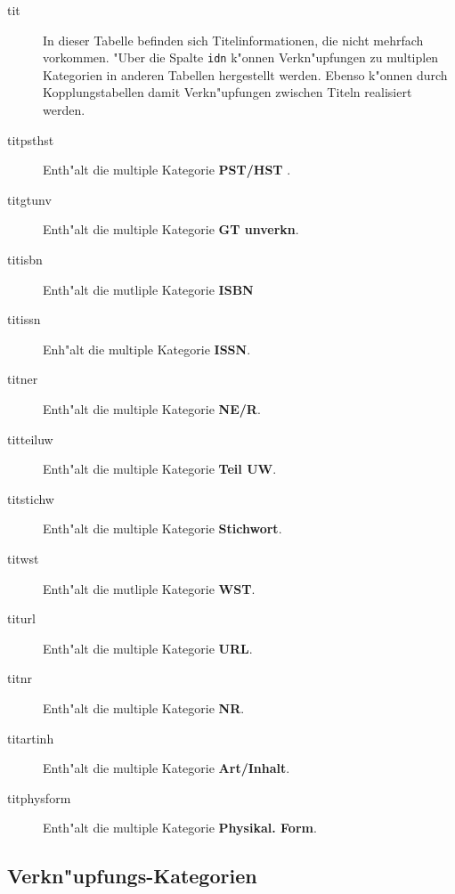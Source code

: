 \documentclass[11pt, twoside, a4paper, BCOR8mm, DIV12, bibtotoc,idxtotoc]{scrbook}
\begin{document}
\begin{description}
\item[tit] In dieser Tabelle befinden sich Titelinformationen, die
  nicht mehrfach vorkommen. "Uber die Spalte \texttt{idn} k"onnen
  Verkn"upfungen zu multiplen Kategorien in anderen Tabellen
  hergestellt werden. Ebenso k"onnen durch Kopplungstabellen damit
  Verkn"upfungen zwischen Titeln realisiert werden.
\item[titpsthst] Enth"alt die multiple Kategorie \textbf{PST/HST} .
\item[titgtunv] Enth"alt die multiple Kategorie \textbf{GT unverkn}.
\item[titisbn] Enth"alt die mutliple Kategorie \textbf{ISBN}
\item[titissn] Enh"alt die multiple Kategorie \textbf{ISSN}.
\item[titner] Enth"alt die multiple Kategorie \textbf{NE/R}.
\item[titteiluw] Enth"alt die multiple Kategorie \textbf{Teil UW}.
\item[titstichw] Enth"alt die multiple Kategorie \textbf{Stichwort}.
\item[titwst] Enth"alt die mutliple Kategorie \textbf{WST}.
\item[titurl] Enth"alt die multiple Kategorie \textbf{URL}.
\item[titnr] Enth"alt die multiple Kategorie \textbf{NR}.
\item[titartinh] Enth"alt die multiple Kategorie \textbf{Art/Inhalt}.
\item[titphysform] Enth"alt die multiple Kategorie
  \textbf{Physikal. Form}.
\end{description}


\subsection{Verkn"upfungs-Kategorien}
\end{document}
